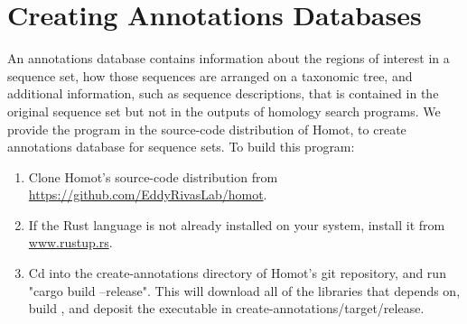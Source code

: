 \documentclass[notoc,justified,openany]{tufte-book}    %
\newcommand{\homot }{{Homot}\xspace}  %
\begin{document}
\chapter{Creating Annotations Databases}
An annotations database contains information about the regions of interest in a sequence set, how those sequences are arranged on a taxonomic tree, and additional information, such as sequence descriptions, that is contained in the original sequence set but not in the outputs of homology search programs.  We provide the  program in the source-code distribution of \homot, to create annotations database for sequence sets.  To build this program:
\begin{enumerate}
\item{Clone \homot's source-code distribution from \url{https://github.com/EddyRivasLab/homot}.}
\item{If the Rust language is not already installed on your system, install it from \url{www.rustup.rs}.}
\item{Cd into the create-annotations directory of \homot's git repository, and run "cargo build --release".  This will download all of the libraries that  depends on, build , and deposit the executable in create-annotations/target/release.}
\end{enumerate}
\end{document}
